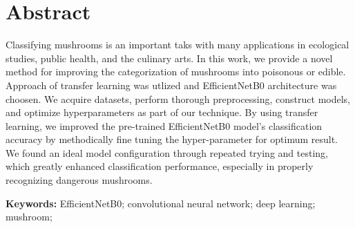 \section{Abstract}
Classifying mushrooms is an important taks with many applications in ecological studies, public health, and the culinary arts. In this work, we provide a novel method for improving the categorization of mushrooms into poisonous or edible. Approach of transfer learning was utlized and EfficientNetB0 architecture was choosen. We acquire datasets, perform thorough preprocessing, construct models, and optimize hyperparameters as part of our technique. By using transfer learning, we improved the pre-trained EfficientNetB0 model's classification accuracy by methodically fine tuning the hyper-parameter for optimum result.
We found an ideal model configuration through repeated trying and testing, which greatly enhanced classification performance, especially in properly recognizing dangerous mushrooms.

\hfill \break

\textbf{Keywords:} 
EfficientNetB0; convolutional neural network; deep learning; mushroom;
 
